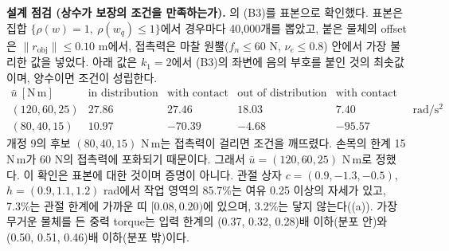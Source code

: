 \documentclass[11pt]{article}\usepackage[margin=1in]{geometry}\usepackage{amsmath,amssymb,amsthm,mathtools}\usepackage{graphicx}\graphicspath{{figures/}{../figures/}{figs/}{./}}\usepackage{enumitem}\usepackage{hyperref}\usepackage{cleveref}\usepackage{tikz}\usetikzlibrary{arrows.meta,positioning,calc,shapes.geometric}\usepackage{float}\usepackage{rotating}\usepackage[most]{tcolorbox}\usepackage{kotex}\usepackage{booktabs}\usepackage{longtable}\emergencystretch=1.6em\tolerance=2000 \crefname{assumption}{Assumption}{Assumptions}\Crefname{assumption}{Assumption}{Assumptions}\crefname{definition}{Definition}{Definitions}\Crefname{definition}{Definition}{Definitions}\crefname{proposition}{Proposition}{Propositions}\Crefname{proposition}{Proposition}{Propositions}\crefname{fact}{Fact}{Facts}\Crefname{fact}{Fact}{Facts} \newtheorem{assumption}{Assumption}\newtheorem{definition}{Definition}\newtheorem{lemma}{Lemma}\newtheorem{proposition}{Proposition}\newtheorem{theorem}{Theorem}\newtheorem{corollary}{Corollary}\newtheorem{fact}{Fact}\theoremstyle{remark}\newtheorem{remark}{Remark} \newcommand{\R}{\mathbb{R}}\newcommand{\xb}{\bar x}\newcommand{\Ab}{\bar A}\newcommand{\By}{\bar B_y}\newcommand{\U}{\mathcal U}\newcommand{\Z}{\mathcal Z}
\begin{document}
\textbf{설계 점검 (상수가 보장의 조건을 만족하는가).} 의 (B3)를 표본으로 확인했다. 표본은 집합 $\{\rho(w)=1,\ \rho(w_q)\le1\}$에서 경우마다 40{,}000개를 뽑았고, 붙은 물체의 offset은 $\|r_{\mathrm{obj}}\|\le0.10$ m에서, 접촉력은 마찰 원뿔($f_n\le60$ N, $\nu_e\le0.8$) 안에서 가장 불리한 값을 넣었다. 아래 값은 $k_1=2$에서 (B3)의 좌변에 음의 부호를 붙인 것의 최솟값이며, 양수이면 조건이 성립한다.
\[
\begin{array}{lcccc}
\bar u\ [\mathrm{N\,m}] & \text{in distribution} & \text{with contact} & \text{out of distribution} & \text{with contact}\\
(120,60,25) & 27.86 & 27.46 & 18.03 & 7.40\\
(80,40,15) & 10.97 & -70.39 & -4.68 & -95.57
\end{array}\quad\mathrm{rad/s^2}
\]
개정 9의 후보 $(80,40,15)$ N\,m는 접촉력이 걸리면 조건을 깨뜨렸다. 손목의 한계 15 N\,m가 60 N의 접촉력에 포화되기 때문이다. 그래서 $\bar u=(120,60,25)$ N\,m로 정했다. 이 확인은 표본에 대한 것이며 증명이 아니다. 관절 상자 $c=(0.9,-1.3,-0.5)$, $h=(0.9,1.1,1.2)$ rad에서 작업 영역의 85.7\%는 여유 0.25 이상의 자세가 있고, 7.3\%는 관절 한계에 가까운 띠 $[0.08,0.20)$에 있으며, 3.2\%는 닿지 않는다((a)). 가장 무거운 물체를 든 중력 torque는 입력 한계의 (0.37, 0.32, 0.28)배 이하(분포 안)와 (0.50, 0.51, 0.46)배 이하(분포 밖)이다.
\end{document}

